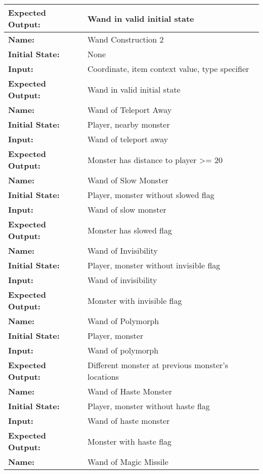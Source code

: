 \documentclass[12pt, titlepage]{article}
\begin{document}
\begin{center}
\begin{longtable}{ l | p{10cm} }
				\textbf{Expected Output:} & Wand in valid initial state\\[0.6em]
				\hline
				\rule{0pt}{1.5em}\textbf{Name:} & Wand Construction 2\\
				\textbf{Initial State:} & None\\
				\textbf{Input:} & Coordinate, item context value, type specifier\\
				\textbf{Expected Output:} & Wand in valid initial state\\[0.6em]
				\hline
				\rule{0pt}{1.5em}\textbf{Name:} & Wand of Teleport Away\\
				\textbf{Initial State:} & Player, nearby monster\\
				\textbf{Input:} & Wand of teleport away\\
				\textbf{Expected Output:} & Monster has distance to player >= 20\\[0.6em]
				\hline
				\rule{0pt}{1.5em}\textbf{Name:} & Wand of Slow Monster\\
				\textbf{Initial State:} & Player, monster without slowed flag\\
				\textbf{Input:} & Wand of slow monster\\
				\textbf{Expected Output:} & Monster has slowed flag\\[0.6em]
				\hline
				\rule{0pt}{1.5em}\textbf{Name:} & Wand of Invisibility\\
				\textbf{Initial State:} & Player, monster without invisible flag\\
				\textbf{Input:} & Wand of invisibility\\
				\textbf{Expected Output:} & Monster with invisible flag\\[0.6em]
				\hline
				\rule{0pt}{1.5em}\textbf{Name:} & Wand of Polymorph\\
				\textbf{Initial State:} & Player, monster\\
				\textbf{Input:} & Wand of polymorph\\
				\textbf{Expected Output:} & Different monster at previous monster's locations\\[0.6em]
				\hline
				\rule{0pt}{1.5em}\textbf{Name:} & Wand of Haste Monster\\
				\textbf{Initial State:} & Player, monster without haste flag\\
				\textbf{Input:} & Wand of haste monster\\
				\textbf{Expected Output:} & Monster with haste flag\\[0.6em]
				\hline
				\rule{0pt}{1.5em}\textbf{Name:} & Wand of Magic Missile\\

\end{longtable}
\end{center}
\end{document}
